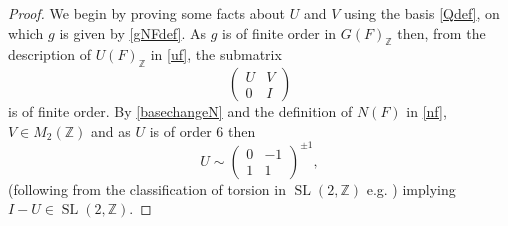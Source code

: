 \documentclass[12pt, a4paper]{article}
\newcommand{\ZZ}{\mathbb{Z}}
\newcommand{\opn}{\operatorname}
\begin{document}
\begin{proof}
  We begin by proving some facts about $U$ and $V$ using the basis \eqref{Qdef}, on which $g$ is given by \eqref{gNFdef}.
  As $g$ is of finite order in $G(F)_{\ZZ}$ then, from the description of $U(F)_{\ZZ}$ in \eqref{uf}, the submatrix
  \[
  \begin{pmatrix}
    U & V \\
    0 & I
  \end{pmatrix}
  \]
  is of finite order.
By \eqref{basechangeN} and the definition of $N(F)$ in \eqref{nf}, $V \in M_2(\ZZ)$ 
and as $U$ is of order 6 then
  \[
  U \sim
  \begin{pmatrix}
    0 & -1 \\
    1 & 1
  \end{pmatrix}^{\pm 1},
  \]
  (following from the classification of torsion in $\opn{SL}(2, \ZZ)$ e.g. \cite{Diamond, Serre}) implying $I - U \in \opn{SL}(2, \ZZ)$.


\end{proof}
\end{document}
